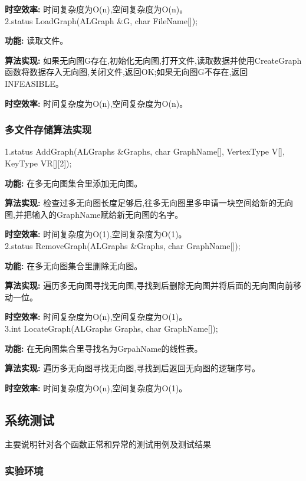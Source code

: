 \documentclass[supercite]{Experimental_Report}
\theoremstyle{definition}
\begin{document}
\textbf{时空效率: }时间复杂度为O(n),空间复杂度为O(n)。\\

2.status LoadGraph(ALGraph \&G, char FileName[]);

\textbf{功能: }读取文件。

\textbf{算法实现: }如果无向图G存在,初始化无向图,打开文件,读取数据并使用CreateGraph函数将数据存入无向图,关闭文件,返回OK;如果无向图G不存在,返回INFEASIBLE。

\textbf{时空效率: }时间复杂度为O(n),空间复杂度为O(n)。\\

\subsubsection{多文件存储算法实现}

1.status AddGraph(ALGraphs \&Graphs, char GraphName[], VertexType V[], KeyType VR[][2]);

\textbf{功能: }在多无向图集合里添加无向图。

\textbf{算法实现: }检查过多无向图长度足够后,往多无向图里多申请一块空间给新的无向图,并把输入的GraphName赋给新无向图的名字。

\textbf{时空效率: }时间复杂度为O(1),空间复杂度为O(1)。\\

2.status RemoveGraph(ALGraphs \&Graphs, char GraphName[]);

\textbf{功能: }在多无向图集合里删除无向图。

\textbf{算法实现: }遍历多无向图寻找无向图,寻找到后删除无向图并将后面的无向图向前移动一位。

\textbf{时空效率: }时间复杂度为O(n),空间复杂度为O(1)。\\

3.int LocateGraph(ALGraphs Graphs, char GraphName[]);

\textbf{功能: }在无向图集合里寻找名为GrpahName的线性表。

\textbf{算法实现: }遍历多无向图寻找无向图,寻找到后返回无向图的逻辑序号。

\textbf{时空效率: }时间复杂度为O(n),空间复杂度为O(1)。\\

\subsection{系统测试}

主要说明针对各个函数正常和异常的测试用例及测试结果

\subsubsection{实验环境}
\end{document}
